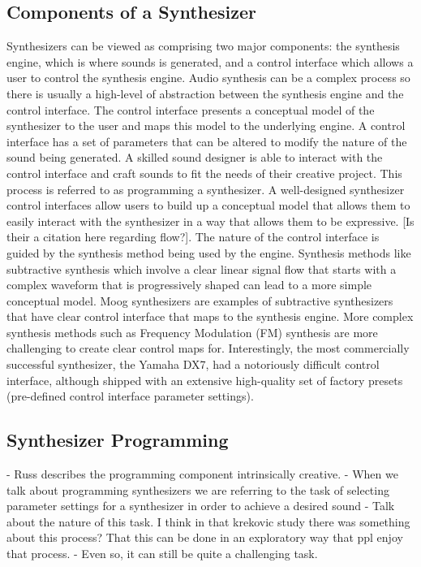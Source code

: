 \subsection{Components of a Synthesizer}
Synthesizers can be viewed as comprising two major components: the synthesis engine, which is where sounds is generated, and a control interface which allows a user to control the synthesis engine. Audio synthesis can be a complex process so there is usually a high-level of abstraction between the synthesis engine and the control interface. The control interface presents a conceptual model of the synthesizer to the user and maps this model to the underlying engine. A control interface has a set of parameters that can be altered to modify the nature of the sound being generated. A skilled sound designer is able to interact with the control interface and craft sounds to fit the needs of their creative project. This process is referred to as programming a synthesizer. A well-designed synthesizer control interfaces allow users to build up a conceptual model that allows them to easily interact with the synthesizer in a way that allows them to be expressive. [Is their a citation here regarding flow?]. The nature of the control interface is guided by the synthesis method being used by the engine. Synthesis methods like subtractive synthesis which involve a clear linear signal flow that starts with a complex waveform that is progressively shaped can lead to a more simple conceptual model. Moog synthesizers are examples of subtractive synthesizers that have clear control interface that maps to the synthesis engine. More complex synthesis methods such as Frequency Modulation (FM) synthesis are more challenging to create clear control maps for. Interestingly, the most commercially successful synthesizer, the Yamaha DX7, had a notoriously difficult control interface, although shipped with an extensive high-quality set of factory presets (pre-defined control interface parameter settings).

\subsection{Synthesizer Programming}
- Russ describes the programming component intrinsically creative.
- When we talk about programming synthesizers we are referring to the task of selecting parameter settings for a synthesizer in order to achieve a desired sound
- Talk about the nature of this task. I think in that krekovic study there was something about this process? That this can be done in an exploratory way that ppl enjoy that process.
- Even so, it can still be quite a challenging task.

